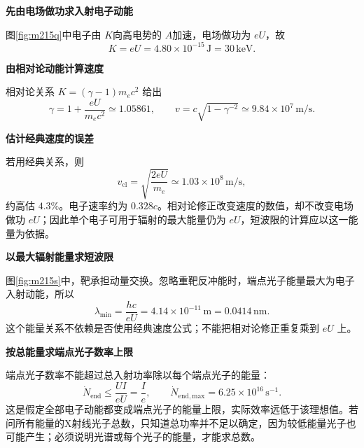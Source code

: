 \begin{solution}\textbf{先由电场做功求入射电子动能}\par\nobreak
图\ref{fig:m215q}中电子由 $K$向高电势的 $A$加速，电场做功为 $eU$，故
\[
 K=eU=4.80\times10^{-15}\,\mathrm J=30\,\mathrm{keV}.
\]


\par\medskip{}\noindent\textbf{由相对论动能计算速度}\par\nobreak
相对论关系 \(K=(\gamma-1)m_ec^2\) 给出
\[
 \gamma=1+\frac{eU}{m_ec^2}\simeq1.05861,\qquad
 \boxed{v=c\sqrt{1-\gamma^{-2}}\simeq9.84\times10^7\,\mathrm{m/s}}.
\]


\par\medskip{}\noindent\textbf{估计经典速度的误差}\par\nobreak
若用经典关系，则
\[
 v_{\mathrm{cl}}=\sqrt{\frac{2eU}{m_e}}
 \simeq1.03\times10^8\,\mathrm{m/s},
\]
约高估 \(4.3\%\)。电子速率约为 \(0.328c\)。相对论修正改变速度的数值，却不改变电场做功 $eU$；因此单个电子可用于辐射的最大能量仍为 $eU$，短波限的计算应以这一能量为依据。




\par\medskip{}\noindent\textbf{以最大辐射能量求短波限}\par\nobreak
图\ref{fig:m215s}中，靶承担动量交换。忽略重靶反冲能时，端点光子能量最大为电子入射动能，所以
\[
 \boxed{\lambda_{\min}=\frac{hc}{eU}
 =4.14\times10^{-11}\,\mathrm m=0.0414\,\mathrm{nm}}.
\]
这个能量关系不依赖是否使用经典速度公式；不能把相对论修正重复乘到 \(eU\) 上。



\par\medskip{}\noindent\textbf{按总能量求端点光子数率上限}\par\nobreak
端点光子数率不能超过总入射功率除以每个端点光子的能量：
\[
 \dot N_{\mathrm{end}}\le\frac{UI}{eU}
 =\frac Ie,\qquad
 \boxed{\dot N_{\mathrm{end,max}}=6.25\times10^{16}\,\mathrm{s^{-1}}}.
\]
这是假定全部电子动能都变成端点光子的能量上限，实际效率远低于该理想值。若问所有能量的X射线光子总数，只知道总功率并不足以确定，因为较低能量光子也可能产生；必须说明光谱或每个光子的能量，才能求总数。
\end{solution}

